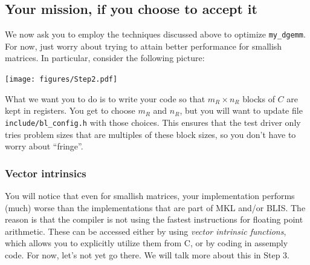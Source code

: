 \subsection{Your mission, if you choose to accept it}
\label{sec:two:mission}

We now ask you to employ the techniques discussed above to optimize {\tt my\_dgemm}.  For now, just worry about trying to attain better performance for smallish matrices.  In particular, consider the following picture:
\begin{center}
	\texttt{[image: figures/Step2.pdf]}
\end{center}
What we want you to do is to write your code so that $ m_R \times n_R $ blocks of $ C $ are kept in registers.  
You get to choose $ m_R $ and $ n_R $, but you will want to update file {\tt include/bl\_config.h} with those choices.
This ensures that the test driver only tries problem sizes that are multiples of these block sizes, so you don't have to worry about ``fringe''.

\subsubsection{Vector intrinsics}

You will notice that even for smallish matrices, your implementation performs (much) worse than the implementations that are part of MKL and/or BLIS.  
The reason is that the compiler is not using the fastest instructions for floating point arithmetic.  These can be accessed either by using {\em vector intrinsic functions}, which allows you to explicitly utilize them from C, or by coding in assemply code.  For now, let's not yet go there.  We will talk more about this in Step 3.

